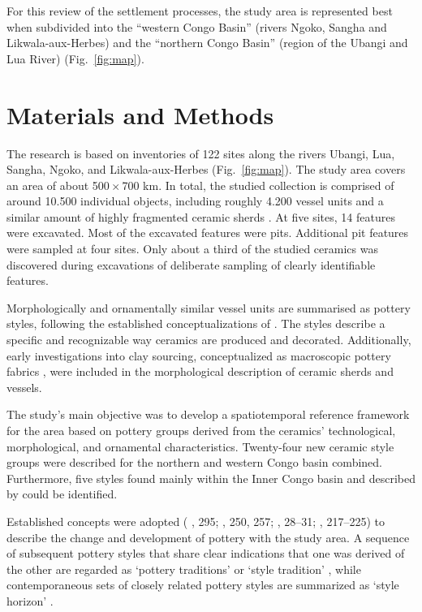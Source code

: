 \documentclass[smallextended,natbib]{svjour3}       %
\begin{document}
For this review of the settlement processes, the study area is represented best when subdivided into the “western Congo Basin” (rivers Ngoko, Sangha and Likwala-aux-Herbes) and the “northern Congo Basin” (region of the Ubangi and Lua River) (Fig.~\ref{fig:map}).

\section*{Materials and Methods}\label{materials}

The research is based on inventories of 122 sites along the rivers Ubangi, Lua, Sangha, Ngoko, and Likwala-aux-Herbes (Fig.~\ref{fig:map}). The study area covers an area of about 500\,$\times$\,700 km. In total, the studied collection is comprised of around 10.500 individual objects, including roughly 4.200 vessel units and a similar amount of highly fragmented ceramic sherds \citep[23--43]{Seidensticker.2021e}. At five sites, 14 features were excavated. Most of the excavated features were pits. Additional pit features were sampled at four sites. Only about a third of the studied ceramics was discovered during excavations of deliberate sampling of clearly identifiable features.

Morphologically and ornamentally similar vessel units are summarised as pottery styles, following the established conceptualizations of \cite[52--57]{Wotzka.1995}. The styles describe a specific and recognizable way ceramics are produced and decorated. Additionally, early investigations into clay sourcing, conceptualized as macroscopic pottery fabrics \citep[60--69]{Seidensticker.2021e}, were included in the morphological description of ceramic sherds and vessels.

The study’s main objective was to develop a spatiotemporal reference framework for the area based on pottery groups derived from the ceramics' technological, morphological, and ornamental characteristics. Twenty-four new ceramic style groups were described for the northern and western Congo basin combined. Furthermore, five styles found mainly within the Inner Congo basin and described by \cite{Wotzka.1995} could be identified.

Established concepts were adopted (\citeauthor{Eggert.1983} \citeyear{Eggert.1983}, 295; \citeyear{Eggert.1984}, 250, 257; \citeyear{Eggert.1988}, 28--31; \citeauthor{Wotzka.1995} \citeyear{Wotzka.1995}, 217--225) to describe the change and development of pottery with the study area. A sequence of subsequent pottery styles that share clear indications that one was derived of the other are regarded as ‘pottery traditions’ or ‘style tradition’ \citep{Rouse.1957,Willey.1945}, while contemporaneous sets of closely related pottery styles are summarized as ‘style horizon’ \citep[108--111]{Kroeber.1944}.
\end{document}
